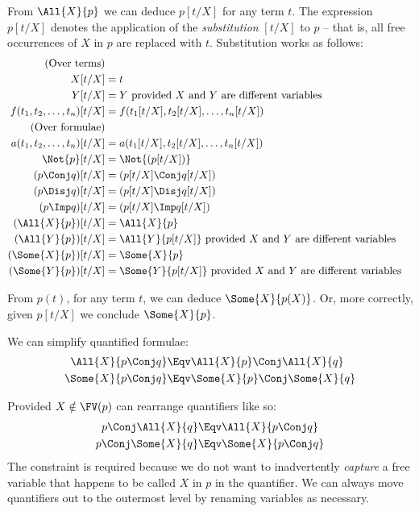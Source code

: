 From $\All{X}{p}$ we can deduce $p[t/X]$ for any term $t$.  The
expression $p[t/X]$ denotes the application of the \emph{substitution}
$[t/X]$ to $p$ -- that is, all free occurrences of $X$ in $p$ are
replaced with $t$.  Substitution works as follows:
\begin{align*}
\text{(Over terms)} \\
X[t/X]
& = t \\
Y[t/X]
& = Y \text{ provided $X$ and $Y$ are different variables} \\
f(t_1, t_2, \ldots, t_n)[t/X]
& = f(t_1[t/X], t_2[t/X], \ldots, t_n[t/X]) \\
\text{(Over formulae)} \\
a(t_1, t_2, \ldots, t_n)[t/X]
& = a(t_1[t/X], t_2[t/X], \ldots, t_n[t/X]) \\
\Not{p}[t/X]
& = \Not{(p[t/X])} \\
(p \Conj q)[t/X]
& = (p[t/X] \Conj q[t/X]) \\
(p \Disj q)[t/X]
& = (p[t/X] \Disj q[t/X]) \\
(p \Imp q)[t/X]
& = (p[t/X] \Imp q[t/X]) \\
(\All{X}{p})[t/X]
& = \All{X}{p} \\
(\All{Y}{p})[t/X]
& = \All{Y}{p[t/X]} \text{ provided $X$ and $Y$ are different variables} \\
(\Some{X}{p})[t/X]
& = \Some{X}{p} \\
(\Some{Y}{p})[t/X]
& = \Some{Y}{p[t/X]} \text{ provided $X$ and $Y$ are different variables} \\
\end{align*}

From $p(t)$, for any term $t$, we can deduce $\Some{X}{p(X)}$.  Or, more
correctly, given $p[t/X]$ we conclude $\Some{X}{p}$.

We can simplify quantified formulae:
\begin{align*}
\All{X}{p \Conj q}
& \Eqv \All{X}{p} \Conj \All{X}{q}\\
\Some{X}{p \Conj q}
& \Eqv \Some{X}{p} \Conj \Some{X}{q}
\end{align*}

Provided $X \notin \FV(p)$ can rearrange quantifiers like so:
\begin{align*}
p \Conj \All{X}{q}
& \Eqv \All{X}{p \Conj q} \\
p \Conj \Some{X}{q}
& \Eqv \Some{X}{p \Conj q} \\
\end{align*}
The constraint is required because we do not want to inadvertently
\emph{capture} a free variable that happens to be called $X$ in $p$ in
the quantifier.  We can always move quantifiers out to the outermost
level by renaming variables as necessary.


